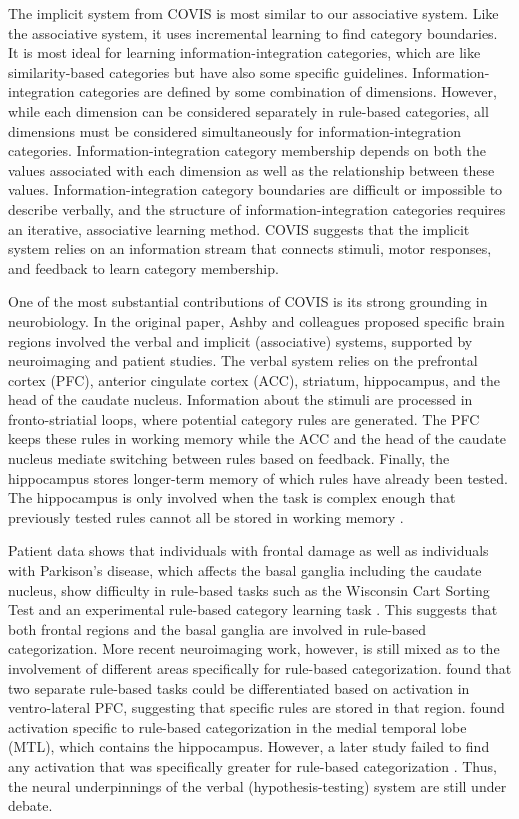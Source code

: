 \documentclass[../dissertation.tex]{subfiles}
\begin{document}
	The implicit system from COVIS is most similar to our associative system. Like the associative system, it uses incremental learning to find category boundaries. It is most ideal for learning information-integration categories, which are like similarity-based categories but have also some specific guidelines. Information-integration categories are defined by some combination of dimensions. However, while each dimension can be considered separately in rule-based categories, all dimensions must be considered simultaneously for information-integration categories. Information-integration category membership depends on both the values associated with each dimension as well as the relationship between these values. Information-integration category boundaries are difficult or impossible to describe verbally, and the structure of information-integration categories requires an iterative, associative learning method. COVIS suggests that the implicit system relies on an information stream that connects stimuli, motor responses, and feedback to learn category membership. \par
	One of the most substantial contributions of COVIS is its strong grounding in neurobiology. In the original paper, Ashby and colleagues proposed specific brain regions involved the verbal and implicit (associative) systems, supported by neuroimaging and patient studies. The verbal system relies on the prefrontal cortex (PFC), anterior cingulate cortex (ACC), striatum, hippocampus, and the head of the caudate nucleus. Information about the stimuli are processed in fronto-striatial loops, where potential category rules are generated. The PFC keeps these rules in working memory while the ACC and the head of the caudate nucleus mediate switching between rules based on feedback. Finally, the hippocampus stores longer-term memory of which rules have already been tested. The hippocampus is only involved when the task is complex enough that previously tested rules cannot all be stored in working memory \citep{Ashby2005,Ashby2011}. \par
	 Patient data shows that individuals with frontal damage as well as individuals with Parkison's disease, which affects the basal ganglia including the caudate nucleus, show difficulty in rule-based tasks such as the Wisconsin Cart Sorting Test \citep{Robinson1980} and an experimental rule-based category learning task \citep{Ashby2003b}. This suggests that both frontal regions and the basal ganglia are involved in rule-based categorization. More recent neuroimaging work, however, is still mixed as to the involvement of different areas specifically for rule-based categorization. \citet{Soto2013} found that two separate rule-based tasks could be differentiated based on activation in ventro-lateral PFC, suggesting that specific rules are stored in that region. \citet{Nomura2007} found activation specific to rule-based categorization in the medial temporal lobe (MTL), which contains the hippocampus. However, a later study failed to find any activation that was specifically greater for rule-based categorization \citep{Carpenter2016}. Thus, the neural underpinnings of the verbal (hypothesis-testing) system are still under debate. \par
\end{document}

